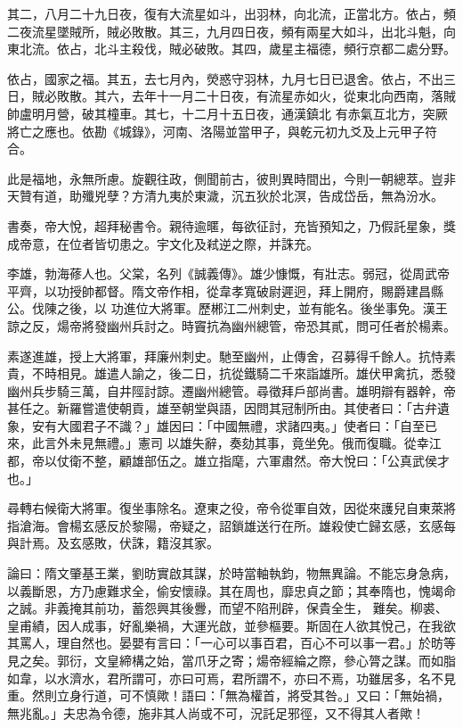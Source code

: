\begin{pinyinscope}
 其二，八月二十九日夜，復有大流星如斗，出羽林，向北流，正當北方。依占，頻二夜流星墜賊所，賊必敗散。其三，九月四日夜，頻有兩星大如斗，出北斗魁，向東北流。依占，北斗主殺伐，賊必破敗。其四，歲星主福德，頻行京都二處分野。



 依占，國家之福。其五，去七月內，熒惑守羽林，九月七日已退舍。依占，不出三日，賊必敗散。其六，去年十一月二十日夜，有流星赤如火，從東北向西南，落賊帥盧明月營，破其橦車。其七，十二月十五日夜，通漢鎮北
 有赤氣互北方，突厥將亡之應也。依勘《城錄》，河南、洛陽並當甲子，與乾元初九爻及上元甲子符合。



 此是福地，永無所慮。旋觀往政，側聞前古，彼則異時間出，今則一朝總萃。豈非天贊有道，助殲兇孽？方清九夷於東濊，沉五狄於北溟，告成岱岳，無為汾水。



 書奏，帝大悅，超拜秘書令。親待逾暱，每欲征討，充皆預知之，乃假託星象，獎成帝意，在位者皆切患之。宇文化及弒逆之際，并誅充。



 李雄，勃海蓚人也。父棠，名列《誠義傳》。雄少慷慨，有壯志。弱冠，從周武帝平齊，以功授帥都督。隋文帝作相，從韋孝寬破尉遲迥，拜上開府，賜爵建昌縣公。伐陳之後，以
 功進位大將軍。歷郴江二州刺史，並有能名。後坐事免。漢王諒之反，煬帝將發幽州兵討之。時竇抗為幽州總管，帝恐其貳，問可任者於楊素。



 素遂進雄，授上大將軍，拜廉州刺史。馳至幽州，止傳舍，召募得千餘人。抗恃素貴，不時相見。雄遣人諭之，後二日，抗從鐵騎二千來詣雄所。雄伏甲禽抗，悉發幽州兵步騎三萬，自井陘討諒。遷幽州總管。尋徵拜戶部尚書。雄明辯有器幹，帝甚任之。新羅嘗遣使朝貢，雄至朝堂與語，因問其冠制所由。其使者曰：「古弁遺象，安有大國君子不識？」雄因曰：「中國無禮，求諸四夷。」使者曰：「自至已來，此言外未見無禮。」憲司
 以雄失辭，奏劾其事，竟坐免。俄而復職。從幸江都，帝以仗衛不整，顧雄部伍之。雄立指麾，六軍肅然。帝大悅曰：「公真武侯才也。」



 尋轉右候衛大將軍。復坐事除名。遼東之役，帝令從軍自效，因從來護兒自東萊將指滄海。會楊玄感反於黎陽，帝疑之，詔鎖雄送行在所。雄殺使亡歸玄感，玄感每與計焉。及玄感敗，伏誅，籍沒其家。



 論曰：隋文肇基王業，劉昉實啟其謀，於時當軸執鈞，物無異論。不能忘身急病，以義斷恩，方乃慮難求全，偷安懷祿。其在周也，靡忠貞之節；其奉隋也，愧竭命之誠。非義掩其前功，蓄怨興其後釁，而望不陷刑辟，保貴全生，
 難矣。柳裘、皇甫績，因人成事，好亂樂禍，大運光啟，並參樞要。斯固在人欲其悅己，在我欲其罵人，理自然也。晏嬰有言曰：「一心可以事百君，百心不可以事一君。」於昉等見之矣。郭衍，文皇締構之始，當爪牙之寄；煬帝經綸之際，參心膂之謀。而如脂如韋，以水濟水，君所謂可，亦曰可焉，君所謂不，亦曰不焉，功雖居多，名不見重。然則立身行道，可不慎歟！語曰：「無為權首，將受其咎。」又曰：「無始禍，無兆亂。」夫忠為令德，施非其人尚或不可，況託足邪徑，又不得其人者歟！




\end{pinyinscope}
